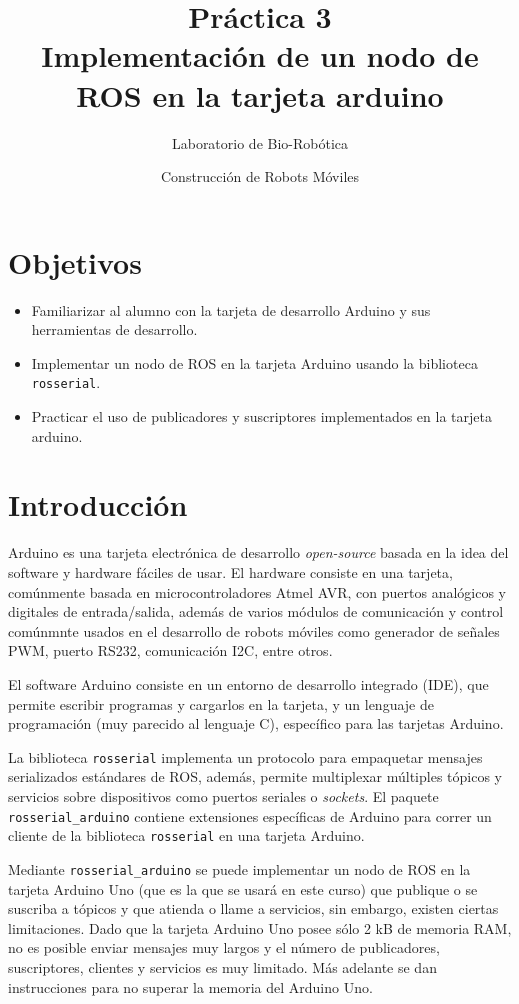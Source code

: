 \documentclass[a4paper,12pt]{article}
\title{Práctica 3 \\ Implementación de un nodo de ROS en la tarjeta arduino}
\author{Laboratorio de Bio-Robótica}
\date{Construcción de Robots Móviles}
\begin{document}
\renewcommand{\tablename}{Tabla}
\maketitle
\section*{Objetivos}
\begin{itemize}
\item Familiarizar al alumno con la tarjeta de desarrollo Arduino y sus herramientas de desarrollo.
\item Implementar un nodo de ROS en la tarjeta Arduino usando la biblioteca \texttt{rosserial}.
\item Practicar el uso de publicadores y suscriptores implementados en la tarjeta arduino. 
\end{itemize}

\section{Introducción}

Arduino es una tarjeta electrónica de desarrollo \textit{open-source} basada en la idea del software y hardware fáciles de usar. El hardware consiste en una tarjeta, comúnmente basada en microcontroladores Atmel AVR, con puertos analógicos y digitales de entrada/salida, además de varios módulos de comunicación y control comúnmnte usados en el desarrollo de robots móviles como generador de señales PWM, puerto RS232, comunicación I2C, entre otros. 

El software Arduino consiste en un entorno de desarrollo integrado (IDE), que permite escribir programas y cargarlos en la tarjeta, y un lenguaje de programación (muy parecido al lenguaje C), específico para las tarjetas Arduino. 

La biblioteca \texttt{rosserial} implementa un protocolo para empaquetar mensajes serializados estándares de ROS, además, permite multiplexar múltiples tópicos y servicios sobre dispositivos como puertos seriales o \textit{sockets}. El paquete \texttt{rosserial\_arduino} contiene extensiones específicas de Arduino para correr un cliente de la biblioteca \texttt{rosserial} en una tarjeta Arduino.

Mediante \texttt{rosserial\_arduino} se puede implementar un nodo de ROS en la tarjeta Arduino Uno (que es la que se usará en este curso) que publique o se suscriba a tópicos y que atienda o llame a servicios, sin embargo, existen ciertas limitaciones. Dado que la tarjeta Arduino Uno posee sólo 2 kB de memoria RAM, no es posible enviar mensajes muy largos y el número de publicadores, suscriptores, clientes y servicios es muy limitado. Más adelante se dan instrucciones para no superar la memoria del Arduino Uno. 
\end{document}
